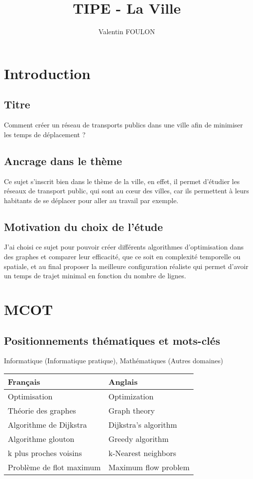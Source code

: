 \documentclass[a4paper,11pt]{article}
\title{TIPE - La Ville}
\author{Valentin FOULON}
\begin{document}
\maketitle
\tableofcontents

\section{Introduction}
\subsection{Titre}
Comment créer un réseau de transports publics dans une ville afin de minimiser les temps de déplacement ?
\subsection{Ancrage dans le thème}
Ce sujet s'inscrit bien dans le thème de la ville, en effet, il permet d'étudier les réseaux de transport public, qui sont au cœur des villes, car ils permettent à leurs habitants de se déplacer pour aller au travail par exemple.
\subsection{Motivation du choix de l'étude}
J'ai choisi ce sujet pour pouvoir créer différents algorithmes d'optimisation dans des graphes et comparer leur efficacité, que ce soit en complexité temporelle ou spatiale, et au final proposer la meilleure configuration réaliste qui permet d'avoir un temps de trajet minimal en fonction du nombre de lignes.

\section{MCOT}
\subsection{Positionnements thématiques et mots-clés}
Informatique (Informatique pratique), Mathématiques (Autres domaines)
\newline
\begin{tabularx}{\textwidth} { 
    | >{\centering\arraybackslash}X 
    | >{\centering\arraybackslash}X | 
    }
    \hline
    \textbf{Français} & \textbf{Anglais} \\ 
    \hline
    Optimisation & Optimization \\ 
    \hline
    Théorie des graphes & Graph theory \\
    \hline
    Algorithme de Dijkstra & Dijkstra's algorithm \\ 
    \hline
    Algorithme glouton & Greedy algorithm \\
    \hline
    k plus proches voisins & k-Nearest neighbors \\
    \hline
    Problème de flot maximum & Maximum flow problem \\
    \hline
  \end{tabularx}
\end{document}
